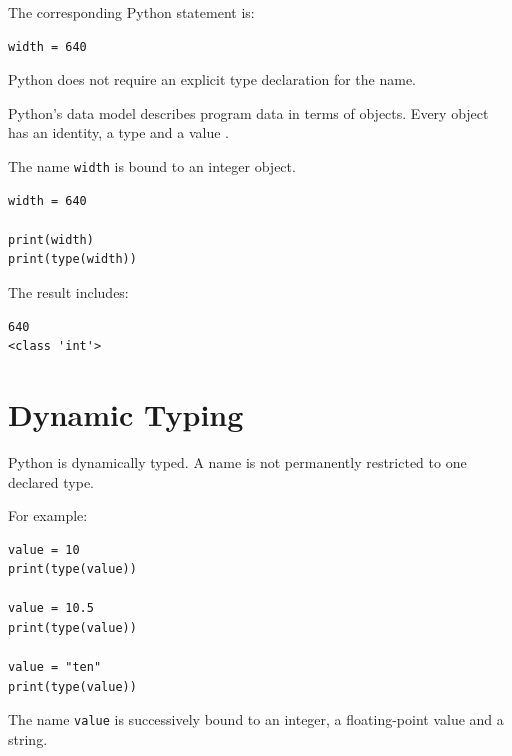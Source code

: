 The corresponding Python statement is:

\begin{verbatim}
width = 640
\end{verbatim}

Python does not require an explicit type declaration for the name.

Python's data model describes program data in terms of objects. Every
object has an identity, a type and a value
\cite{python_data_model}.

The name \texttt{width} is bound to an integer object.

\begin{listing}[htbp]
    \caption{Inspecting a Python value and its type.}
    \label{lst:python-object-type}

\begin{verbatim}
width = 640

print(width)
print(type(width))
\end{verbatim}

\end{listing}

The result includes:

\begin{verbatim}
640
<class 'int'>
\end{verbatim}


\section{Dynamic Typing}
\label{sec:dynamic-typing}

Python is dynamically typed. A name is not permanently restricted to
one declared type.

For example:

\begin{listing}[htbp]
    \caption{Binding one name to objects of different types.}
    \label{lst:dynamic-typing}

\begin{verbatim}
value = 10
print(type(value))

value = 10.5
print(type(value))

value = "ten"
print(type(value))
\end{verbatim}

\end{listing}

The name \texttt{value} is successively bound to an
integer, a floating-point value and a string.

